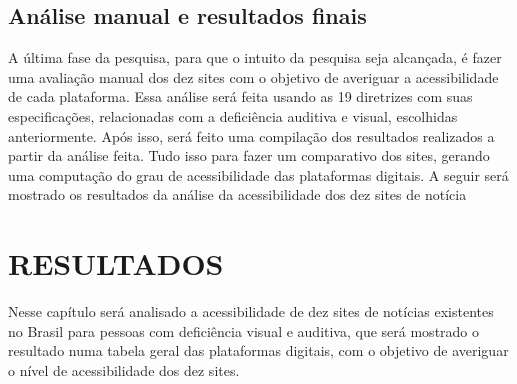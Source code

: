 \documentclass[a4paper]{article}
\begin{document}
\begin{titlepage}
\subsection{Análise manual e resultados finais}

A última fase da pesquisa, para que o intuito da pesquisa seja alcançada, é fazer uma avaliação manual dos dez sites com o objetivo de averiguar a acessibilidade de cada plataforma. Essa análise será feita usando as 19 diretrizes com suas especificações, relacionadas com a deficiência auditiva e visual, escolhidas anteriormente. Após isso, será feito uma compilação dos resultados realizados a partir da análise feita. Tudo isso para fazer um comparativo dos sites, gerando uma computação do grau de acessibilidade das plataformas digitais. A seguir será mostrado os resultados da análise da acessibilidade dos dez sites de notícia\\[8cm]

\section{RESULTADOS}

Nesse capítulo será analisado a acessibilidade de dez sites de notícias existentes no Brasil para pessoas com deficiência visual e auditiva, que será mostrado o resultado numa tabela geral das plataformas digitais, com o objetivo de averiguar o nível de acessibilidade dos dez sites.\\


\end{titlepage}
\end{document}
